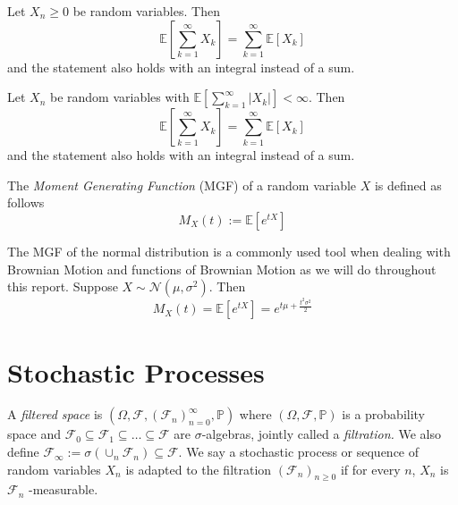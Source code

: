 \begin{theorem}[Tonelli]
    Let $X_n\geq0$ be random variables. Then 
    \begin{equation}
        \mathbb{E}\left[\sum_{k=1}^\infty X_k\right]=\sum_{k=1}^\infty\mathbb{E}[X_k]
    \end{equation}
    and the statement also holds with an integral instead of a sum.
\end{theorem}

\begin{theorem}[Fubini]
    Let $X_n$ be random variables with $\mathbb{E}\left[\sum_{k=1}^\infty|X_k|\right]<\infty$.
    Then 
    \begin{equation}
        \mathbb{E}\left[\sum_{k=1}^\infty X_k\right]=\sum_{k=1}^\infty\mathbb{E}[X_k]
    \end{equation}
    and the statement also holds with an integral instead of a sum.
\end{theorem}

\begin{definition}
    The \emph{Moment Generating Function} (MGF) of a random variable $X$ is defined as follows
    \begin{equation}
        M_X(t):=\mathbb{E}[e^{tX}]
    \end{equation}
\end{definition}

\begin{remark}
    The MGF of the normal distribution is a commonly used tool when dealing with
    Brownian Motion and functions of Brownian Motion as we will do throughout this
    report. Suppose $X\sim\mathcal{N}(\mu,\sigma^2)$. Then
    \begin{equation}
        M_X(t)=\mathbb{E}[e^{tX}]=e^{t\mu+\frac{t^2\sigma^2}{2}}
    \end{equation}
\end{remark}

\section{Stochastic Processes}

\begin{definition}
    A \emph{filtered space} is $(\Omega,\mathcal{F},(\mathcal{F}_n)_{n=0}^\infty,\mathbb{P})$
    where $(\Omega,\mathcal{F},\mathbb{P})$ is a probability space and 
    $\mathcal{F}_0\subseteq\mathcal{F}_1\subseteq\dots\subseteq\mathcal{F}$
    are $\sigma$-algebras, jointly called a \emph{filtration.} We also define
    $\mathcal{F}_\infty:=\sigma(\cup_n\mathcal{F}_n)\subseteq\mathcal{F}.$ We
    say a stochastic process or sequence of random variables $X_n$ is adapted to
    the filtration $(\mathcal{F}_n)_{n\geq0}$ if for every $n$, $X_n$ is $\mathcal{F}_n$
    -measurable. 
\end{definition}

